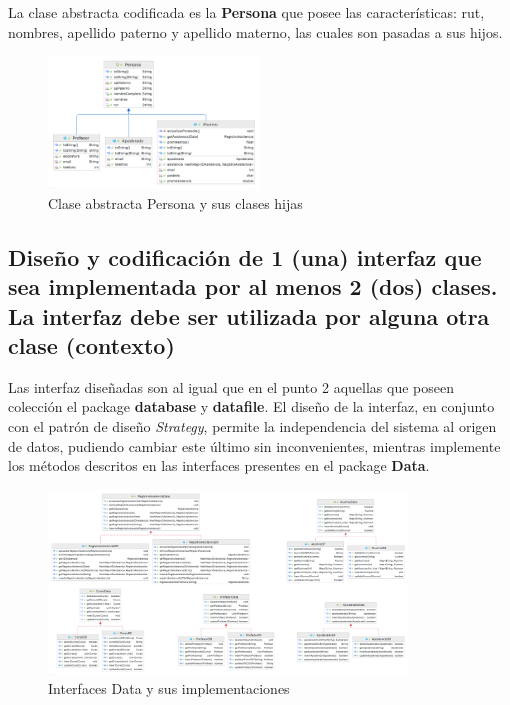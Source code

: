 La clase abstracta codificada es la \textbf{Persona} que posee las características: rut, nombres, apellido paterno y apellido materno, las cuales son pasadas a sus hijos.

\begin{figure}[h]
    \centering
    \includegraphics[width=0.5\textwidth]{contents/img/img10}
    \caption{Clase abstracta Persona y sus clases hijas}
    \label{fig:img10}
\end{figure}

\clearpage

\subsection{Diseño y codificación de 1 (una) interfaz que sea implementada por al menos 2 (dos) clases. La interfaz debe ser utilizada por alguna otra clase (contexto)}

Las interfaz diseñadas son al igual que en el punto 2 aquellas que poseen colección el package \textbf{database} y \textbf{datafile}. El diseño de la interfaz, en conjunto con el patrón de diseño \textit{Strategy}, permite la independencia del sistema al origen de datos, pudiendo cambiar este último sin inconvenientes, mientras implemente los métodos descritos en las interfaces presentes en el package \textbf{Data}.

\begin{figure}[h]
    \centering
    \includegraphics[width=0.85\textwidth]{contents/img/img11}
    \caption{Interfaces Data y sus implementaciones}
    \label{fig:img11}
\end{figure}

